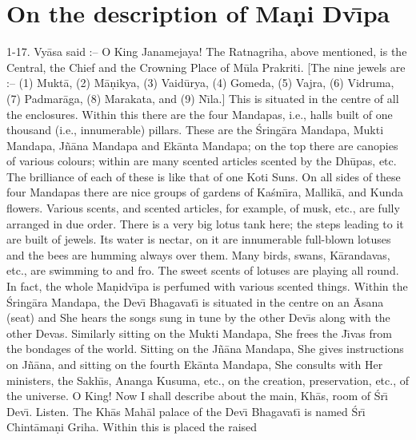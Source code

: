 \chapter{On the description of Ma\d{n}i Dv\={\i}pa}

1-17. Vy\=asa said :-- O King Janamejaya! The Ratnagriha, above mentioned, is the Central, the Chief and the Crowning Place of M\=ula Prakriti. [The nine jewels are :-- (1) Mukt\=a, (2) M\=a\d{n}ikya, (3) Vaid\=urya, (4) Gomeda, (5) Vajra, (6) Vidruma, (7) Padmar\=aga, (8) Marakata, and (9) N\={\i}la.] This is situated in the centre of all the enclosures. Within this there are the four Mandapas, i.e., halls built of one thousand (i.e., innumerable) pillars. These are the \'Sring\=ara Mandapa, Mukti Mandapa, J\~n\=ana Mandapa and Ek\=anta Mandapa; on the top there are canopies of various colours; within are many scented articles scented by the Dh\=upas, etc. The brilliance of each of these is like that of one Koti Suns. On all sides of these four Mandapas there are nice groups of gardens of Ka\'sm\={\i}ra, Mallik\=a, and Kunda flowers. Various scents, and scented articles, for example, of musk, etc., are fully arranged in due order. There is a very big lotus tank here; the steps leading to it are built of jewels. Its water is nectar, on it are innumerable full-blown lotuses and the bees are humming always over them. Many birds, swans, K\=arandavas, etc., are swimming to and fro. The sweet scents of lotuses are playing all round. In fact, the whole Ma\d{n}idv\={\i}pa is perfumed with various scented things. Within the \'Sring\=ara Mandapa, the Dev\={\i} Bhagavat\={\i} is situated in the centre on an \=Asana (seat) and She hears the songs sung in tune by the other Dev\={\i}s along with the other Devas. Similarly sitting on the Mukti Mandapa, She frees the J\={\i}vas from the bondages of the world. Sitting on the J\~n\=ana Mandapa, She gives instructions on J\~n\=ana, and sitting on the fourth Ek\=anta Mandapa, She consults with Her ministers, the Sakh\={\i}s, Ananga Kusuma, etc., on the creation, preservation, etc., of the universe. O King! Now I shall describe about the main, Kh\=as, room of \'Sr\={\i} Dev\={\i}. Listen. The Kh\=as Mah\=al palace of the Dev\={\i} Bhagavat\={\i} is named \'Sr\={\i} Chint\=ama\d{n}i Griha. Within this is placed the raised

